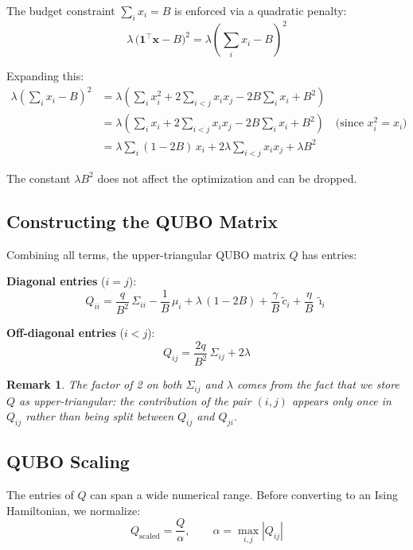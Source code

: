 \documentclass[12pt, a4paper]{article}
\newtheorem{remark}{Remark}[section]
\begin{document}
The budget constraint $\sum_i x_i = B$ is enforced via a quadratic penalty:
\[
\lambda\, \bigl(\mathbf{1}^\top \mathbf{x} - B\bigr)^2
= \lambda \left( \sum_i x_i - B \right)^2
\]

Expanding this:
\begin{align}
\lambda \left(\sum_i x_i - B\right)^2
&= \lambda \left( \sum_i x_i^2 + 2\sum_{i<j} x_i x_j - 2B\sum_i x_i + B^2 \right) \\
&= \lambda \left( \sum_i x_i + 2\sum_{i<j} x_i x_j - 2B\sum_i x_i + B^2 \right)
    \quad \text{(since } x_i^2 = x_i \text{)} \\
&= \lambda \sum_i (1 - 2B)\, x_i + 2\lambda \sum_{i<j} x_i x_j + \lambda B^2
\end{align}

The constant $\lambda B^2$ does not affect the optimization and can be dropped.

\subsection{Constructing the QUBO Matrix}

Combining all terms, the upper-triangular QUBO matrix $Q$ has entries:

\textbf{Diagonal entries} ($i = j$):
\begin{equation}
Q_{ii} = \frac{q}{B^2}\, \Sigma_{ii}
         - \frac{1}{B}\, \mu_i
         + \lambda\,(1 - 2B)
         + \frac{\gamma}{B}\, \tilde{c}_i
         + \frac{\eta}{B}\, \tilde{\imath}_i
\label{eq:qubo_diagonal}
\end{equation}

\textbf{Off-diagonal entries} ($i < j$):
\begin{equation}
Q_{ij} = \frac{2q}{B^2}\, \Sigma_{ij} + 2\lambda
\label{eq:qubo_offdiag}
\end{equation}

\begin{remark}
The factor of 2 on both $\Sigma_{ij}$ and $\lambda$ comes from the fact that
we store $Q$ as upper-triangular: the contribution of the pair $(i,j)$ appears
only once in $Q_{ij}$ rather than being split between $Q_{ij}$ and $Q_{ji}$.
\end{remark}

\subsection{QUBO Scaling}

The entries of $Q$ can span a wide numerical range. Before converting to an
Ising Hamiltonian, we normalize:
\[
Q_{\text{scaled}} = \frac{Q}{\alpha}, \qquad \alpha = \max_{i,j} |Q_{ij}|
\]
\end{document}
